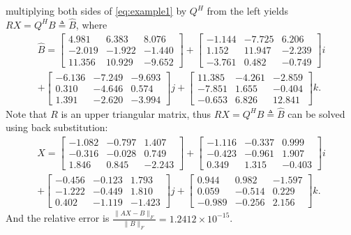 \documentclass[5p,10pt]{elsarticle}
\numberwithin{equation}{section}
\begin{document}
multiplying both sides of \eqref{eq:example1} by \(Q^H\) from the left yields \(RX = Q^HB\triangleq\hat{B}\),
where
\begin{align*}
\hat{B} =
\begin{bmatrix}
4.981 & 6.383 & 8.076 \\
-2.019 & -1.922 & -1.440 \\
11.356 & 10.929 & -9.652
\end{bmatrix} +
\begin{bmatrix}
-1.144 & -7.725 & 6.206 \\
1.152 & 11.947 & -2.239 \\
-3.761 & 0.482 & -0.749
\end{bmatrix} i \\+
\begin{bmatrix}
-6.136 & -7.249 & -9.693 \\
0.310 & -4.646 & 0.574 \\
1.391 & -2.620 & -3.994
\end{bmatrix} j +
\begin{bmatrix}
11.385 & -4.261 & -2.859 \\
-7.851 & 1.655 & -0.404 \\
-0.653 & 6.826 & 12.841
\end{bmatrix} k.
\end{align*}
Note that \(R\) is an upper triangular matrix, thus   \(RX = Q^HB\triangleq\hat{B}\)  can be solved using back substitution:
 \begin{align*}
X =
\begin{bmatrix}
-1.082 & -0.797 & 1.407 \\
-0.316 & -0.028 & 0.749 \\
1.846 & 0.845 & -2.243
\end{bmatrix} +
\begin{bmatrix}
-1.116 & -0.337 & 0.999 \\
-0.423 & -0.961 & 1.907 \\
0.349 & 1.315 & -0.403
\end{bmatrix} i \\+
\begin{bmatrix}
-0.456 & -0.123 & 1.793 \\
-1.222 & -0.449 & 1.810 \\
0.402 & -1.119 & -1.423
\end{bmatrix} j +
\begin{bmatrix}
0.944 & 0.982 & -1.597 \\
0.059 & -0.514 & 0.229 \\
-0.989 & -0.256 & 2.156
\end{bmatrix} k.
\end{align*}
And the relative error is $\frac{\|AX - B\|_F}{\|B\|_F} = 1.2412\times 10^{-15}$.
\end{document}
